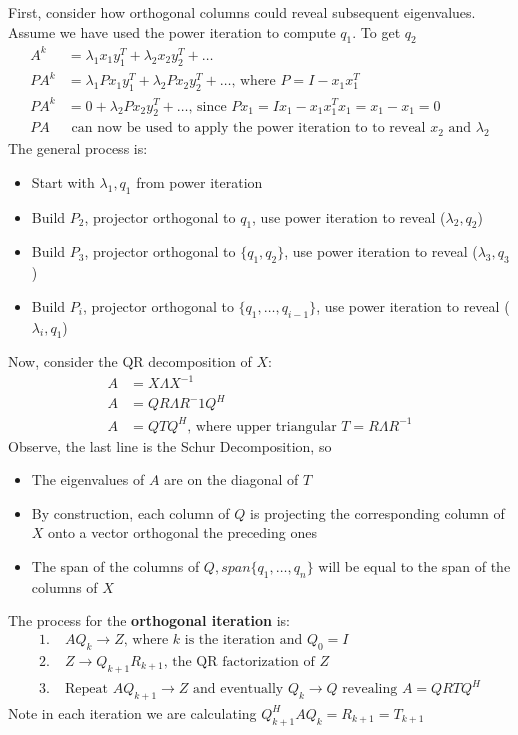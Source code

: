 \documentclass{article}
\begin{document}
First, consider how orthogonal columns could reveal subsequent eigenvalues. Assume we have used the power iteration to compute $q_1$. To get $q_2$
\begin{align*}
    A^k &= \lambda_1x_1y_1^T + \lambda_2x_2y_2^T + \dots\\
    PA^k &= \lambda_1Px_1y_1^T + \lambda_2Px_2y_2^T + \dots \textrm{, where } P = I - x_1x_1^T\\
    PA^k &= 0 + \lambda_2Px_2y_2^T + \dots \textrm{, since } Px_1 = Ix_1 - x_1x_1^Tx_1 = x_1 - x_1 = 0\\
    PA &\textrm{ can now be used to apply the power iteration to to reveal $x_2$ and $\lambda_2$}
\end{align*}
The general process is:
\begin{itemize}
    \item Start with $\lambda_1, q_1$ from power iteration
    \item Build $P_2$, projector orthogonal to $q_1$, use power iteration to reveal ($\lambda_2, q_2$)
    \item Build $P_3$, projector orthogonal to $\{q_1, q_2\}$, use power iteration to reveal ($\lambda_3, q_3$)
    \item Build $P_i$, projector orthogonal to $\{q_1, \dots, q_{i-1}\}$, use power iteration to reveal ($\lambda_i, q_1$)
\end{itemize}
Now, consider the QR decomposition of $X$:
\begin{align*}
    A &= X\Lambda X^{-1}\\
    A &= QR \Lambda R^-1 Q^H\\
    A &= QTQ^H \textrm{, where upper triangular } T = R\Lambda R^{-1}
\end{align*}
Observe, the last line is the Schur Decomposition, so
\begin{itemize}
    \item The eigenvalues of $A$ are on the diagonal of $T$
    \item By construction, each column of $Q$ is projecting the corresponding column of $X$ onto a vector orthogonal the preceding ones
    \item The span of the columns of $Q, span\{q_1, \dots, q_n\}$ will be equal to the span of the columns of $X$
\end{itemize}
The process for the \textbf{orthogonal iteration} is:
\begin{align*}
    1. \;& AQ_k \rightarrow Z \textrm{, where $k$ is the iteration and } Q_0 = I\\
    2. \;& Z \rightarrow Q_{k+1}R_{k+1} \textrm{, the QR factorization of $Z$}\\
    3. \;& \textrm{Repeat } AQ_{k+1} \rightarrow Z \textrm{ and eventually } Q_k \rightarrow Q \textrm{ revealing } A = QRTQ^H
\end{align*}
Note in each iteration we are calculating $Q_{k+1}^HAQ_k = R_{k+1} = T_{k+1}$ 
\end{document}
